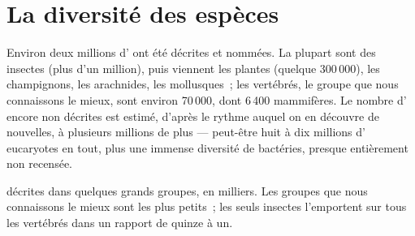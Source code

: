 \section{La diversité des espèces}

\begin{proposition}\label{prop:g10:biodiversity-scales:count}
Environ deux millions d' ont été décrites et nommées. La plupart
sont des insectes (plus d'un million), puis viennent les plantes
(quelque 300\,000), les champignons, les arachnides, les mollusques~;
les vertébrés, le groupe que nous connaissons le mieux, sont environ
70\,000, dont 6\,400 mammifères. Le nombre d' encore non
décrites est estimé, d'après le rythme auquel on en découvre de
nouvelles, à plusieurs millions de plus --- peut-être huit à dix
millions d' eucaryotes en tout, plus une immense diversité de
bactéries, presque entièrement non recensée.
\end{proposition}

\begin{omfigure}

{\small {} décrites dans quelques grands groupes, en milliers. Les
groupes que nous connaissons le mieux sont les plus petits~; les seuls
insectes l'emportent sur tous les vertébrés dans un rapport de quinze
à un.}
\end{omfigure}

